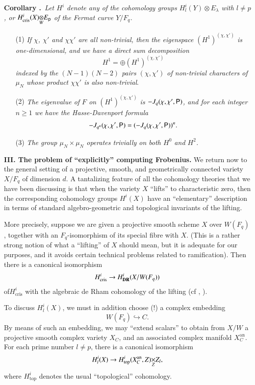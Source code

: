 \noindent
{\bf Corollary .\label{art6-coro2.4}}~{\em Let $H^{i}$ denote any of the cohomology groups $H^{i}_{l}(Y)\otimes E_{\lambda}$ with $l\neq p$, or $\foprod{H^{i}_{\text{cris}}(X)}{E_{\sfp}}{W}$ of the Fermat curve $Y/F_{q}$.}
\begin{itemize}
\item[(1)] {\em If $\chi$, $\chi'$ and $\chi\chi'$ are all non-trivial, then the eigenspace $(H^{1})^{(\chi,\chi')}$ is one-dimensional, and we have a direct sum decomposition}
$$
H^{1}=\oplus (H^{1})^{(\chi,\chi')}
$$
{\em indexed by the $(N-1)(N-2)$ pairs $(\chi,\chi')$ of non-trivial characters of $\mu_{N}$ whose product $\chi\chi'$ is also non-trivial}.

\item[(2)] {\em The eigenvalue of $F$ on $(H^{1})^{(\chi,\chi')}$ is $-J_{q}(\chi,\chi',\mathsf{P})$, and for each integer $n\geq 1$ we have the Hasse-Davenport formula}
$$
-J_{q^{n}}(\chi,\chi',\mathsf{P})=(-J_{q}(\chi,\chi',\mathsf{P}))^{n}.
$$

\item[(3)] {\em The group $\mu_{N}\times \mu_{N}$ operates trivially on both $H^{0}$ and $H^{2}$.}
\end{itemize}

\bigskip
\noindent
{\bf III. The problem of ``explicitly'' computing Frobenius.} We return now to the general setting of a projective, smooth, and geometrically connected variety $X/F_{q}$ of dimension $d$. A tantalizing feature of all the cohomology theories that we have been discussing is that when the variety $X$ ``lifts'' to characteristic zero, then the corresponding cohomology groups $H^{i}(X)$ have an ``elementary'' description in terms of standard algebro-geometric and topological invariants of the lifting.

More precisely, suppose we are given a projective smooth scheme $X$ over $W(F_{q})$, together with an $F_{q}$-isomorphism of its special fibre with $X$. (This is a rather strong notion of what a ``lifting'' of $X$ should mean, but it is adequate for our purposes, and it avoids certain technical problems related to ramification). Then there is a canonical isomorphism
$$
H^{i}_{\text{cris}}\to H^{i}_{\mathbf{DR}}(X/W(F_{q}))
$$
of\pageoriginale $H^{i}_{\text{cris}}$ with the algebraic de Rham cohomology of the lifting (cf \cite{art6-key19}, \cite{art6-key27}).

To discuss $H^{i}_{l}(X)$, we must in addition choose (!) a complex embedding
$$
W(F_{q})\hookrightarrow C.
$$
By means of such an embedding, we may ``extend scalars'' to obtain from $X/W$ a projective smooth complex variety $X_{C}$, and an associated complex manifold $X^{\text{an}}_{C}$. For each prime number $l\neq p$, there is a canonical isomorphism
$$
H^{i}_{l}(X)\to \fprod{H^{i}_{\text{top}}(X^{\text{an}}_{C},Z)}{Z_{l}}{Z},
$$
where $H^{i}_{\text{top}}$ denotes the usual ``topological'' cohomology.

